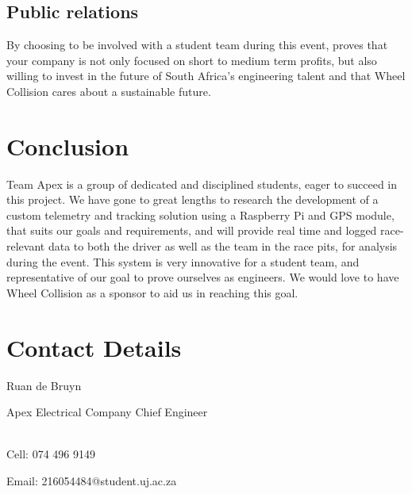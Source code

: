 \documentclass[a4paper, 12pt]{article}
\newcommand{\company}{Wheel Collision}
\begin{document}
		\subsection{Public relations} %
		\label{sub:public_relations}
			By choosing to be involved with a student team during this event, proves that your company is not only focused on short to medium term profits, but also willing to invest in the future of South Africa's engineering talent and that \company{} cares about a sustainable future.
	
	\section{Conclusion} %
	\label{sec:conclusion}
		Team Apex is a group of dedicated and disciplined students, eager to succeed in this project. We have gone to great lengths to research the development of a custom telemetry and tracking solution using a Raspberry Pi and GPS module, that suits our goals and requirements, and will provide real time and logged race-relevant data to both the driver as well as the team in the race pits, for analysis during the event. This system is very innovative for a student team, and representative of our goal to prove ourselves as engineers. We would love to have \company{} as a sponsor to aid us in reaching this goal.

	\newpage
	\section{Contact Details} %
	\label{sec:contact_details}
		Ruan de Bruyn\par\noindent
		Apex Electrical Company Chief Engineer\par\par\noindent\\
		Cell: 074 496 9149\par\noindent
		Email: 216054484@student.uj.ac.za


\end{document}
